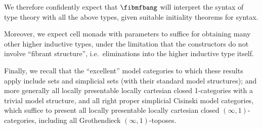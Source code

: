 \documentclass{amsart}
\begin{document}
We therefore confidently expect that $\fibmfbang$ will interpret the syntax of type theory with all the above types, given suitable initiality theorems for syntax.

Moreover, we expect cell monads with parameters to suffice for obtaining many other higher inductive types, under the limitation that the constructors do not involve ``fibrant structure'', i.e.\ eliminations into the higher inductive type itself.

Finally, we recall that the ``excellent'' model categories to which these results apply include sets and simplicial sets (with their standard model structures); and more generally all locally presentable locally cartesian closed 1-categories with a trivial model structure, and all right proper simplicial Cisinski model categories, which suffice to present all locally presentable locally cartesian closed $(\infty,1)$-categories, including all Grothendieck $(\infty,1)$-toposes.
 


\end{document}
